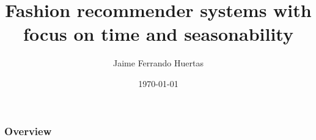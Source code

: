 \documentclass{beamer}
\title[Fashion recommender systems]{Fashion recommender systems with focus on time and 
        seasonability} %
\author{Jaime Ferrando Huertas} %
{

\medskip
}
\date{\today} %
\begin{document}
\begin{frame}
\titlepage %
\end{frame}

\begin{frame}
\frametitle{Overview} %
\tableofcontents %
\end{frame}


\end{document}
